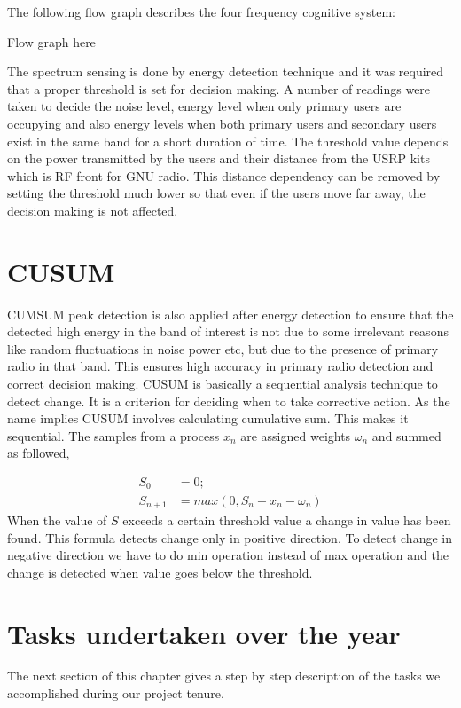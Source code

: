 The following flow graph describes the four frequency cognitive system:

Flow graph here

The spectrum sensing is done by energy detection technique and it was required 
that a proper threshold is set for decision making. A number of readings were 
taken to decide the noise level, energy level when only primary users are 
occupying and also energy levels when both primary users and secondary users 
exist in the same band for a short duration of time. The threshold value 
depends on the power transmitted by the users and their distance from the USRP 
kits which is RF front for GNU radio. This distance dependency can be removed by 
setting the threshold much lower so that even if the users move 
far away, the decision making is not affected.  





\section{CUSUM}
CUMSUM peak detection is also applied after energy detection to ensure that the
detected high energy in the band of interest is not due to some irrelevant 
reasons like random fluctuations in noise power etc, but due to the presence of 
primary radio in that band. This ensures high accuracy in primary radio 
detection and correct decision making.
CUSUM is basically a sequential analysis technique to detect change. 
It is a criterion for deciding when to take corrective action. As the name 
implies CUSUM involves calculating cumulative sum. This makes it sequential. 
The samples from a process $x_n$  are assigned weights $\omega_n$  and summed 
as followed,

\begin{align}
S_0 &= 0; \nonumber \\
S_{n+1} &= max(0, S_n + x_n - \omega_n) \nonumber
\end{align}
When the value of $S$ exceeds a certain threshold value a change in value has 
been found. This formula detects change only in positive direction. To detect 
change in negative direction we have to do min operation instead of max 
operation and the change  is detected when value goes below the threshold.







\section{Tasks undertaken over the year}
The next section of this chapter gives a step by step description of the tasks we 
accomplished during our project tenure. 


